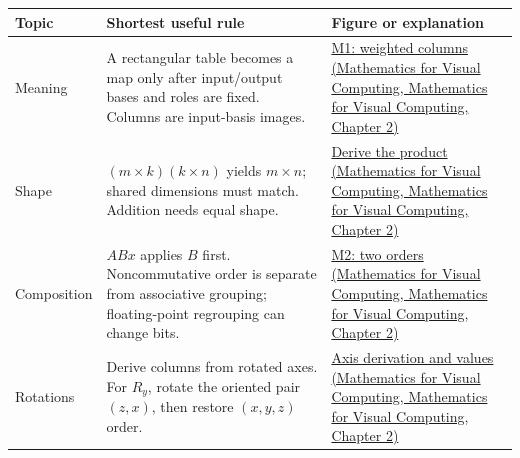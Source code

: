 {\def\LTcaptype{none} %
\begin{longtable}[]{@{}
  >{\raggedright\arraybackslash}p{}
  >{\raggedright\arraybackslash}p{}
  >{\raggedright\arraybackslash}p{}@{}}
\toprule\noalign{}
\begin{minipage}[b]{\linewidth}\raggedright
Topic
\end{minipage} & \begin{minipage}[b]{\linewidth}\raggedright
Shortest useful rule
\end{minipage} & \begin{minipage}[b]{\linewidth}\raggedright
Figure or explanation
\end{minipage} \\
\midrule\noalign{}
\endhead
\bottomrule\noalign{}
\endlastfoot
Meaning & A rectangular table becomes a map only after input/output bases and roles are fixed. Columns are input-basis images. & \href{../02-Mathematics-for-Visual-Computing/main.pdf\#nameddest=01-foundations-i-ch018-figure-m1---coordinates-weight-the-new-basis-directions}{M1: weighted columns (Mathematics for Visual Computing, Mathematics for Visual Computing, Chapter 2)} \\
Shape & \((m\times k)(k\times n)\) yields \(m\times n\); shared dimensions must match. Addition needs equal shape. & \href{../02-Mathematics-for-Visual-Computing/main.pdf\#nameddest=01-foundations-i-ch018-combining-rules-explains-the-multiplication-law}{Derive the product (Mathematics for Visual Computing, Mathematics for Visual Computing, Chapter 2)} \\
Composition & \(ABx\) applies \(B\) first. Noncommutative order is separate from associative grouping; floating-point regrouping can change bits. & \href{../02-Mathematics-for-Visual-Computing/main.pdf\#nameddest=01-foundations-i-ch018-figure-m2---the-same-operations-give-different-results-in-different-orders}{M2: two orders (Mathematics for Visual Computing, Mathematics for Visual Computing, Chapter 2)} \\
Rotations & Derive columns from rotated axes. For \(R_y\), rotate the oriented pair \((z,x)\), then restore \((x,y,z)\) order. & \href{../02-Mathematics-for-Visual-Computing/main.pdf\#nameddest=01-foundations-i-ch018-the-oriented-plane-explains-the-y-rotation-signs}{Axis derivation and values (Mathematics for Visual Computing, Mathematics for Visual Computing, Chapter 2)} \\

\end{longtable}}
